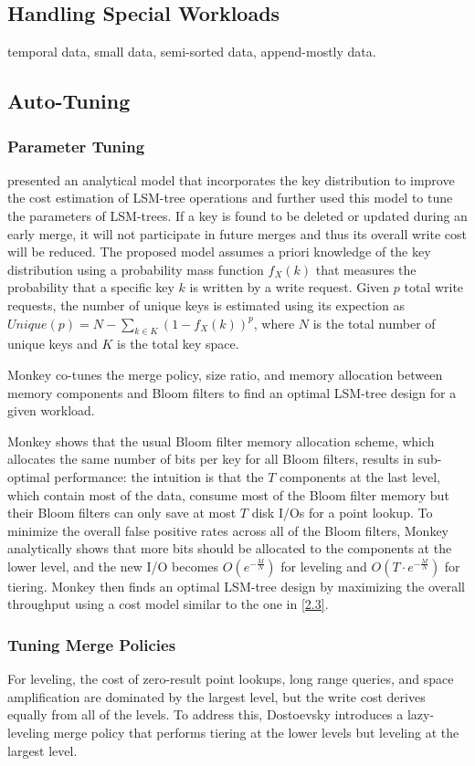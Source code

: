 \documentclass[11pt]{article}
\begin{document}
\subsection{Handling Special Workloads}
\label{sec:orgeb124bb}
temporal data, small data, semi-sorted data, append-mostly data.
\subsection{Auto-Tuning}
\label{sec:org62ace6c}
\subsubsection{Parameter Tuning}
\label{sec:org29dcaba}
\cite{10.5555/2930583.2930595}  presented an analytical model that incorporates the key distribution to
improve the cost estimation of LSM-tree operations and further used this model to tune the parameters
of LSM-trees. If a key is found to be deleted or updated during an early merge, it will not
participate in future merges and thus its overall write cost will be reduced. The proposed model
assumes a priori knowledge of the key distribution using a probability mass function \(f_X(k)\) that
measures the probability that a specific key \(k\) is written by a write request. Given \(p\) total
write requests, the number of unique keys is estimated using its expection as
\(Unique(p)=N-\sum_{k\in K}(1-f_X(k))^p\), where \(N\) is the total number of unique keys and \(K\) is
the total key space.

Monkey co-tunes the merge policy, size ratio, and memory allocation between memory components and
Bloom filters to find an optimal LSM-tree design for a given workload.

Monkey shows that the usual Bloom filter memory allocation scheme, which allocates the same number
of bits per key for all Bloom filters, results in sub-optimal performance: the intuition is that
the \(T\) components at the last level, which contain most of the data, consume most of the Bloom
filter memory but their Bloom filters can only save at most \(T\) disk I/Os for a point lookup. To
minimize the overall false positive rates across all of the Bloom filters, Monkey analytically
shows that more bits should be allocated to the components at the lower level, and the new I/O
becomes \(O(e^{-\frac{M}{N}})\) for leveling and \(O(T\cdot e^{-\frac{M}{N}})\) for tiering. Monkey
then finds an optimal LSM-tree design by maximizing the overall throughput using a cost model similar
to the one in \ref{2.3}.
\subsubsection{Tuning Merge Policies}
\label{sec:org7599398}
For leveling, the cost of zero-result point lookups, long range queries, and space amplification are
dominated by the largest level, but the write cost derives equally from all of the levels. To address
this, Dostoevsky\cite{10.1145/3183713.3196927} introduces a lazy-leveling merge policy that performs
tiering at the lower levels but leveling at the largest level.
\end{document}
